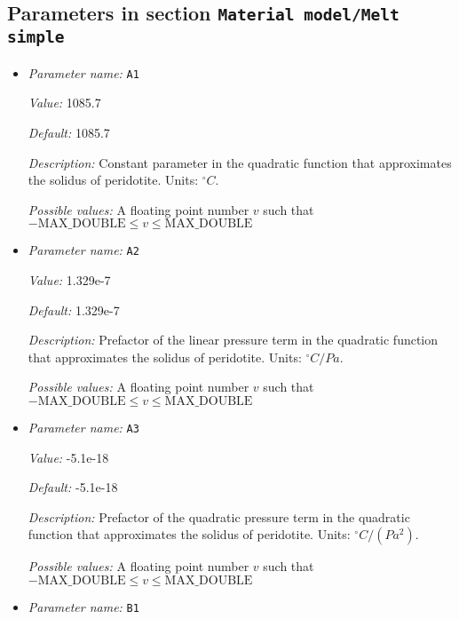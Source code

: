 \subsection{Parameters in section \tt Material model/Melt simple}
\label{parameters:Material_20model/Melt_20simple}

\begin{itemize}
\item {\it Parameter name:} {\tt A1}
\label{parameters:Material model/Melt simple/A1}
\label{parameters:Material_20model/Melt_20simple/A1}


{\it Value:} 1085.7


{\it Default:} 1085.7


{\it Description:} Constant parameter in the quadratic function that approximates the solidus of peridotite. Units: ${}^\circ C$.


{\it Possible values:} A floating point number $v$ such that $-\text{MAX\_DOUBLE} \leq v \leq \text{MAX\_DOUBLE}$
\item {\it Parameter name:} {\tt A2}
\label{parameters:Material model/Melt simple/A2}
\label{parameters:Material_20model/Melt_20simple/A2}


{\it Value:} 1.329e-7


{\it Default:} 1.329e-7


{\it Description:} Prefactor of the linear pressure term in the quadratic function that approximates the solidus of peridotite. Units: ${}^\circ C/Pa$.


{\it Possible values:} A floating point number $v$ such that $-\text{MAX\_DOUBLE} \leq v \leq \text{MAX\_DOUBLE}$
\item {\it Parameter name:} {\tt A3}
\label{parameters:Material model/Melt simple/A3}
\label{parameters:Material_20model/Melt_20simple/A3}


{\it Value:} -5.1e-18


{\it Default:} -5.1e-18


{\it Description:} Prefactor of the quadratic pressure term in the quadratic function that approximates the solidus of peridotite. Units: ${}^\circ C/(Pa^2)$.


{\it Possible values:} A floating point number $v$ such that $-\text{MAX\_DOUBLE} \leq v \leq \text{MAX\_DOUBLE}$
\item {\it Parameter name:} {\tt B1}
\label{parameters:Material model/Melt simple/B1}
\label{parameters:Material_20model/Melt_20simple/B1}



\end{itemize}
